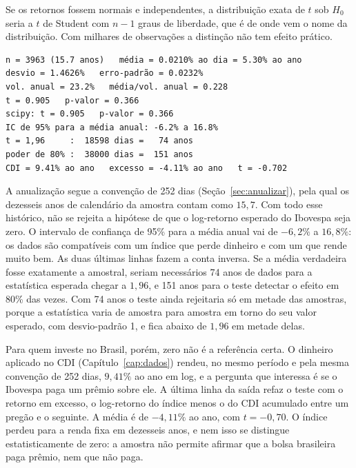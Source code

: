 Se os retornos fossem normais e independentes, a distribuição exata de $t$ sob $H_0$ seria a $t$ de Student com $n-1$ graus de liberdade, que é de onde vem o nome da distribuição. Com milhares de observações a distinção não tem efeito prático.


\begin{lstlisting}[style=saida]
n = 3963 (15.7 anos)   média = 0.0210% ao dia = 5.30% ao ano
desvio = 1.4626%   erro-padrão = 0.0232%
vol. anual = 23.2%   média/vol. anual = 0.228
t = 0.905   p-valor = 0.366
scipy: t = 0.905   p-valor = 0.366
IC de 95% para a média anual: -6.2% a 16.8%
t = 1,96     :  18598 dias =   74 anos
poder de 80% :  38000 dias =  151 anos
CDI = 9.41% ao ano   excesso = -4.11% ao ano   t = -0.702
\end{lstlisting}

A anualização segue a convenção de 252 dias (Seção~\ref{sec:anualizar}), pela qual os dezesseis anos de calendário da amostra contam como $15,7$. Com todo esse histórico, não se rejeita a hipótese de que o log-retorno esperado do Ibovespa seja zero. O intervalo de confiança de 95\% para a média anual vai de $-6,2\%$ a $16,8\%$: os dados são compatíveis com um índice que perde dinheiro e com um que rende muito bem. As duas últimas linhas fazem a conta inversa. Se a média verdadeira fosse exatamente a amostral, seriam necessários 74 anos de dados para a estatística esperada chegar a $1,96$, e 151 anos para o teste detectar o efeito em 80\% das vezes. Com 74 anos o teste ainda rejeitaria só em metade das amostras, porque a estatística varia de amostra para amostra em torno do seu valor esperado, com desvio-padrão 1, e fica abaixo de $1,96$ em metade delas.

Para quem investe no Brasil, porém, zero não é a referência certa. O dinheiro aplicado no CDI (Capítulo~\ref{cap:dados}) rendeu, no mesmo período e pela mesma convenção de 252 dias, $9,41\%$ ao ano em log, e a pergunta que interessa é se o Ibovespa paga um prêmio sobre ele. A última linha da saída refaz o teste com o retorno em excesso, o log-retorno do índice menos o do CDI acumulado entre um pregão e o seguinte. A média é de $-4,11\%$ ao ano, com $t = -0,70$. O índice perdeu para a renda fixa em dezesseis anos, e nem isso se distingue estatisticamente de zero: a amostra não permite afirmar que a bolsa brasileira paga prêmio, nem que não paga.

